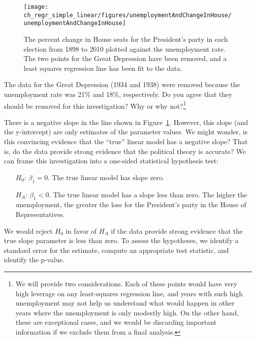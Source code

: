\begin{figure}
\centering
\texttt{[image: ch\_regr\_simple\_linear/figures/unemploymentAndChangeInHouse/unemploymentAndChangeInHouse]}
\caption{The percent change in House seats for the President's party in each election from 1898 to 2010 plotted against the unemployment rate. The two points for the Great Depression have been removed, and a least squares regression line has been fit to the data.}
\label{unemploymentAndChangeInHouse}
\end{figure}

\textC{\newpage}

\begin{exercise}
The data for the Great Depression (1934 and 1938) were removed because the unemployment rate was 21\% and 18\%, respectively. Do you agree that they should be removed for this investigation? Why or why not?\footnote{We will provide two considerations. Each of these points would have very high leverage on any least-squares regression line, and years with such high unemployment may not help us understand what would happen in other years where the unemployment is only modestly high. On the other hand, these are exceptional cases, and we would be discarding important information if we exclude them from a final analysis.}
\end{exercise}

There is a negative slope in the line shown in Figure~\ref{unemploymentAndChangeInHouse}. However, this slope (and the y-intercept) are only estimates of the parameter values. We might wonder, is this convincing evidence that the ``true'' linear model has a negative slope? That is, do the data provide strong evidence that the political theory is accurate? We can frame this investigation into a one-sided statistical hypothesis test:
\begin{itemize}
\item[$H_0$:] $\beta_1 = 0$. The true linear model has slope zero.
\item[$H_A$:] $\beta_1 < 0$. The true linear model has a slope less than zero. The higher the unemployment, the greater the loss for the President's party in the House of Representatives.
\end{itemize}
We would reject $H_0$ in favor of $H_A$ if the data provide strong evidence that the true slope parameter is less than zero. To assess the hypotheses, we identify a standard error for the estimate, compute an appropriate test statistic, and identify the p-value.


